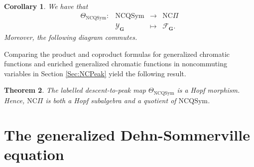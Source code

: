 \documentclass[11pt]{amsart}
\newtheorem{Theorem}{Theorem}[section]
\newtheorem{Corollary}[Theorem]{Corollary}
\numberwithin{equation}{section}
\newcommand{\NCQSym}{\mathrm{NCQSym}}
\newcommand{\QSym}{\mathrm{QSym}}
\newcommand{\NCPeak}{\mathrm{NC}\Pi}
\newcommand{\scrX}{{\mathscr{X}}}
\newcommand{\scrY}{{\mathscr{Y}}}
\newcommand{\scrE}{{\mathscr{E}}}
\newcommand{\scrF}{{\mathscr{F}}}
\newcommand{\bfG}{{\mathbf{G}}}
\begin{document}
\begin{Corollary}\label{cor:theta-gcf}
We have that
$$
\begin{array}{cccc}
\Theta_{\NCQSym}:& \NCQSym & \rightarrow & \NCPeak\\
& \scrY_\bfG& \mapsto& \scrF_\bfG.
\end{array} 
$$
Moreover, the following diagram commutes.

\begin{center}
\end{center}
\end{Corollary}
Comparing the product and coproduct formulas for generalized chromatic functions and enriched generalized chromatic functions in noncommuting variables in Section \ref{Sec:NCPeak} yield the following result.
\begin{Theorem}\label{theta-hopf}
	The labelled descent-to-peak map $\Theta_{\NCQSym}$ is a Hopf morphism. Hence, $\NCPeak$ is both a Hopf subalgebra and a quotient of $\NCQSym$.
\end{Theorem}


\section{The generalized Dehn-Sommerville equation}\label{sec:D-S}
\end{document}
